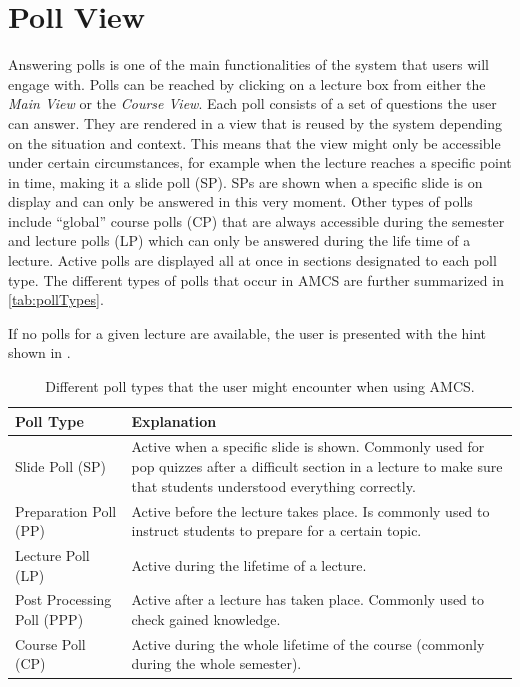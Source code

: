 \section{Poll View}
\label{section:soa:pollview}
Answering polls is one of the main functionalities of the system that users will engage with.
Polls can be reached by clicking on a lecture box from either the \emph{Main View} or the \emph{Course View}.
Each poll consists of a set of questions the user can answer. They are rendered in a view that is reused  by the system depending on the situation and context. This means that the view might only be accessible under certain circumstances, for example when the lecture reaches a specific point in time, making it a slide poll (SP). SPs are shown when a specific slide is on display and can only be answered in this very moment. Other types of polls include “global” course polls (CP) that are always accessible during the semester and lecture polls (LP) which can only be answered during the life time of a lecture.
Active polls are displayed all at once in sections designated to each poll type.
The different types of polls that occur in AMCS are further summarized in \autoref{tab:pollTypes}.

If no polls for a given lecture are available, the user is presented with the hint shown in \todogrf.

\begin{table}[t]
	{\renewcommand{\arraystretch}{2}
		\begin{tabular}{ | p{5cm} | p{10cm} |}
			\hline
			Poll Type & Explanation \\ \hline \hline
			Slide Poll (SP) & Active when a specific slide is shown. Commonly used for pop quizzes after a difficult section in a lecture to make sure that students understood everything correctly. \\ \hline
			Preparation Poll (PP) & Active before the lecture takes place. Is commonly used to instruct students to prepare for a certain topic. \\ \hline
			Lecture Poll (LP) & Active during the lifetime of a lecture. \\ \hline
			Post Processing Poll (PPP) & Active after a lecture has taken place. Commonly used to check gained knowledge. \\ \hline
			Course Poll (CP) & Active during the whole lifetime of the course (commonly during the whole semester). \\
			\hline
		\end{tabular}
	}
	\caption{Different poll types that the user might encounter when using AMCS.}
	\label{tab:pollTypes}
\end{table}

